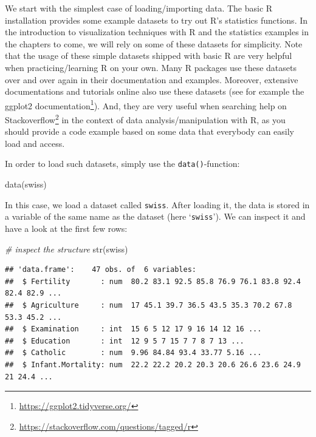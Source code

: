 \documentclass[
  12pt,
]{style/krantz}
\newenvironment{Shaded}{\begin{snugshade}}{\end{snugshade}}
\newcommand{\CommentTok}[1]{\textcolor[rgb]{0.56,0.35,0.01}{\textit{#1}}}
\newcommand{\FunctionTok}[1]{\textcolor[rgb]{0.00,0.00,0.00}{#1}}
\newcommand{\NormalTok}[1]{#1}
\renewcommand{\href}[2]{#2\footnote{\url{#1}}}
\begin{document}
We start with the simplest case of loading/importing data. The basic R installation provides some example datasets to try out R's statistics functions. In the introduction to visualization techniques with R and the statistics examples in the chapters to come, we will rely on some of these datasets for simplicity. Note that the usage of these simple datasets shipped with basic R are very helpful when practicing/learning R on your own. Many R packages use these datasets over and over again in their documentation and examples. Moreover, extensive documentations and tutorials online also use these datasets (see for example the \href{https://ggplot2.tidyverse.org/}{ggplot2 documentation}). And, they are very useful when searching help on \href{https://stackoverflow.com/questions/tagged/r}{Stackoverflow} in the context of data analysis/manipulation with R, as you should provide a code example based on some data that everybody can easily load and access.

In order to load such datasets, simply use the \texttt{data()}-function:

\begin{Shaded}
\begin{Highlighting}[]
\FunctionTok{data}\NormalTok{(swiss)}
\end{Highlighting}
\end{Shaded}

In this case, we load a dataset called \texttt{swiss}. After loading it, the data is stored in a variable of the same name as the dataset (here `\texttt{swiss}'). We can inspect it and have a look at the first few rows:

\begin{Shaded}
\begin{Highlighting}[]
\CommentTok{\# inspect the structure}
\FunctionTok{str}\NormalTok{(swiss)}
\end{Highlighting}
\end{Shaded}

\begin{verbatim}
## 'data.frame':    47 obs. of  6 variables:
##  $ Fertility       : num  80.2 83.1 92.5 85.8 76.9 76.1 83.8 92.4 82.4 82.9 ...
##  $ Agriculture     : num  17 45.1 39.7 36.5 43.5 35.3 70.2 67.8 53.3 45.2 ...
##  $ Examination     : int  15 6 5 12 17 9 16 14 12 16 ...
##  $ Education       : int  12 9 5 7 15 7 7 8 7 13 ...
##  $ Catholic        : num  9.96 84.84 93.4 33.77 5.16 ...
##  $ Infant.Mortality: num  22.2 22.2 20.2 20.3 20.6 26.6 23.6 24.9 21 24.4 ...
\end{verbatim}
\end{document}
